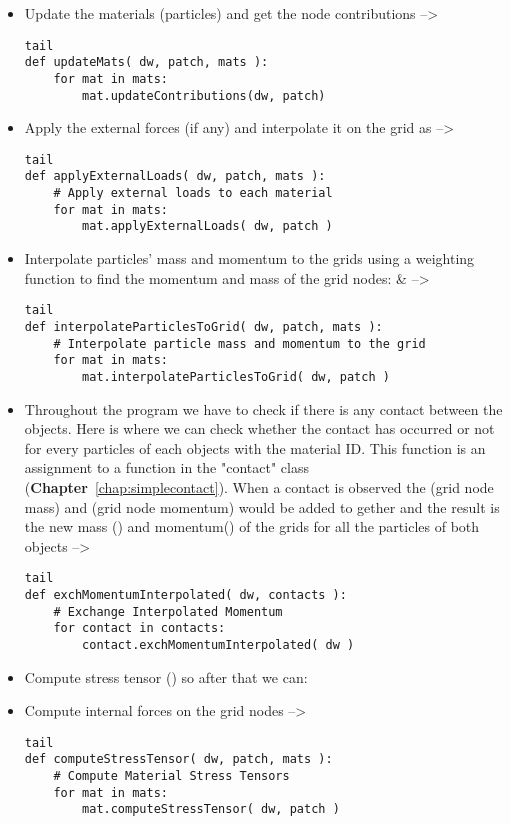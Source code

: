 \documentclass[11pt,fleqn]{book} %
\begin{document}
\begin{itemize}
\item Update the materials (particles) and get the node contributions --> 
\begin{lstlisting}tail
def updateMats( dw, patch, mats ):
    for mat in mats:
        mat.updateContributions(dw, patch)
\end{lstlisting}
\item Apply the external forces (if any) and interpolate it on the grid as  --> 
\begin{lstlisting}tail
def applyExternalLoads( dw, patch, mats ):
    # Apply external loads to each material
    for mat in mats:
        mat.applyExternalLoads( dw, patch )
\end{lstlisting}
\item Interpolate particles' mass and momentum to the grids using a weighting function to find the momentum and mass of the grid nodes:  \&  --> 
\begin{lstlisting}tail
def interpolateParticlesToGrid( dw, patch, mats ):
    # Interpolate particle mass and momentum to the grid
    for mat in mats:
        mat.interpolateParticlesToGrid( dw, patch ) 
\end{lstlisting}
\item Throughout the program we have to check if there is any contact between the objects. Here is where we can check whether the contact has occurred or not for every particles of each objects with the material ID. This function is an assignment to a function in the "contact" class (\textbf{Chapter}~\ref{chap:simplecontact}). When a contact is observed the  (grid node mass) and  (grid node momentum) would be added to gether and the result is the new mass () and momentum() of the grids for all the particles of both objects --> 
\begin{lstlisting}tail
def exchMomentumInterpolated( dw, contacts ):
    # Exchange Interpolated Momentum
    for contact in contacts:
        contact.exchMomentumInterpolated( dw )
\end{lstlisting}
\item Compute stress tensor () so after that we can:
\item Compute internal forces on the grid nodes --> 
\begin{lstlisting}tail
def computeStressTensor( dw, patch, mats ):
    # Compute Material Stress Tensors
    for mat in mats:
        mat.computeStressTensor( dw, patch )


\end{lstlisting}
\end{itemize}
\end{document}
